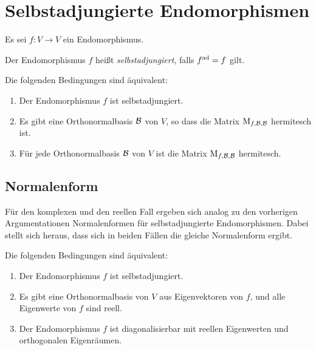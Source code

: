 \section{Selbstadjungierte Endomorphismen}

Es sei $f \colon V \to V$ ein Endomorphismus.

\begin{definition}
  Der Endomorphismus $f$ heißt \emph{selbstadjungiert}, falls $f^{\operatorname{ad}} = f$ gilt.
\end{definition}

\begin{lemma}
  Die folgenden Bedingungen sind äquivalent:
  \begin{enumerate}
    \item
      Der Endomorphismus $f$ ist selbstadjungiert.
    \item
      Es gibt eine Orthonormalbasis $\mathcal{B}$ von $V$, so dass die Matrix $\operatorname{M}_{f, \mathcal{B}, \mathcal{B}}$ hermitesch ist.
    \item
      Für jede Orthonormalbasis $\mathcal{B}$ von $V$ ist die Matrix $\operatorname{M}_{f, \mathcal{B}, \mathcal{B}}$ hermitesch.
  \end{enumerate}
\end{lemma}



\subsection{Normalenform}

Für den komplexen und den reellen Fall ergeben sich analog zu den vorherigen Argumentationen Normalenformen für selbstadjungierte Endomorphismen.
Dabei stellt sich heraus, dass sich in beiden Fällen die gleiche Normalenform ergibt.

\begin{theorem}
  Die folgenden Bedingungen sind äquivalent:
  \begin{enumerate}
    \item
      Der Endomorphismus $f$ ist selbstadjungiert.
    \item
      Es gibt eine Orthonormalbasis von $V$ aus Eigenvektoren von $f$, und alle Eigenwerte von $f$ sind reell.
    \item
      Der Endomorphismus $f$ ist diagonalisierbar mit reellen Eigenwerten und orthogonalen Eigenräumen.
  \end{enumerate}
\end{theorem}

